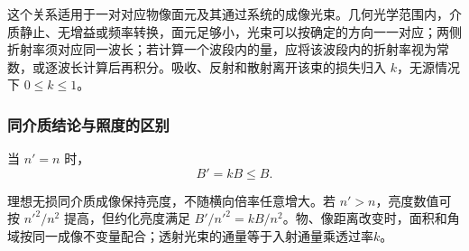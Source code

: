 \documentclass[UTF8,fontset=fandol,a4paper,11pt]{ctexart}
\begin{document}
这个关系适用于一对对应物像面元及其通过系统的成像光束。几何光学范围内，介质静止、无增益或频率转换，面元足够小，光束可以按确定的方向一一对应；两侧折射率须对应同一波长；若计算一个波段内的量，应将该波段内的折射率视为常数，或逐波长计算后再积分。吸收、反射和散射离开该束的损失归入 $k$，无源情况下 $0\le k\le1$。

\subsubsection*{同介质结论与照度的区别}
当 $n'=n$ 时，
\[
\boxed{B'=kB\le B}.
\]

理想无损同介质成像保持亮度，不随横向倍率任意增大。若 $n'>n$，亮度数值可按 $n'^2/n^2$ 提高，但约化亮度满足 $B'/n'^2=kB/n^2$。物、像距离改变时，面积和角域按同一成像不变量配合；透射光束的通量等于入射通量乘透过率$k$。
\end{document}

